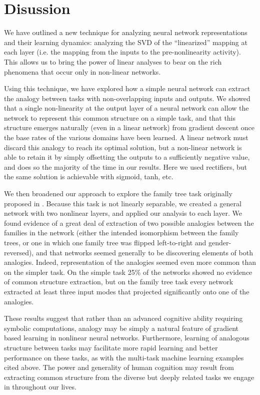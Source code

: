\documentclass[10pt,letterpaper]{article}
\begin{document}
\section{Disussion}
We have outlined a new technique for analyzing neural network representations and their learning dynamics: analyzing the SVD of the ``linearized'' mapping at each layer (i.e. the mapping from the inputs to the pre-nonlinearity activity). This allows us to bring the power of linear analyses to bear on the rich phenomena that occur only in non-linear networks.\par
Using this technique, we have explored how a simple neural network can extract the analogy between tasks with non-overlapping inputs and outputs. We showed that a single non-linearity at the output layer of a neural network can allow the network to represent this common structure on a simple task, and that this structure emerges naturally (even in a linear network) from gradient descent once the base rates of the various domains have been learned. A linear network must discard this analogy to reach its optimal solution, but a non-linear network is able to retain it by simply offsetting the outputs to a sufficiently negative value, and does so the majority of the time in our results. Here we used rectifiers, but the same solution is achievable with sigmoid, tanh, etc. \par 
We then broadened our approach to explore the family tree task originally proposed in \citet{Hinton1986}. Because this task is not linearly separable, we created a general network with two nonlinear layers, and applied our analysis to each layer. We found evidence of a great deal of extraction of two possible analogies between the families in the network (either the intended isomorphism between the family trees, or one in which one family tree was flipped left-to-right and gender-reversed), and that networks seemed generally to be discovering elements of both analogies. Indeed, representation of the analogies seemed even more common than on the simpler task. On the simple task 25\% of the networks showed no evidence of common structure extraction, but on the family tree task every network extracted at least three input modes that projected significantly onto one of the analogies. \par 
These results suggest that rather than an advanced cognitive ability requiring symbolic computations, analogy may be simply a natural feature of gradient based learning in nonlinear neural networks. Furthermore, learning of analogous structure between tasks may facilitate more rapid learning and better performance on these tasks, as with the multi-task machine learning examples cited above. The power and generality of human cognition may result from extracting common structure from the diverse but deeply related tasks we engage in throughout our lives. 
\end{document}
